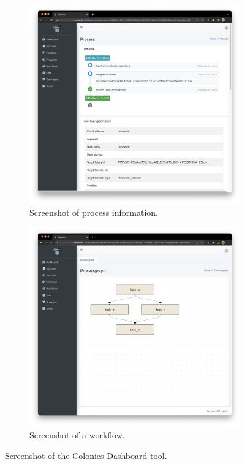 \documentclass{article}
\begin{document}
\begin{figure}
     \centering
     \begin{subfigure}[b]{0.49\textwidth}
         \centering
         \includegraphics[scale=0.17]{dashboard1.png}
         \caption{Screenshot of process information.}
     	 \label{fig:dashboard1}
     \end{subfigure}
     \hfill
     \begin{subfigure}[b]{0.49\textwidth}
         \centering
         \includegraphics[scale=0.17]{dashboard2.png}
      	 \caption{Screenshot of a workflow.}
     	 \label{fig:dashboard2}
     \end{subfigure}
     \caption{Screenshot of the Colonies Dashboard tool.}
\end{figure}
\end{document}
